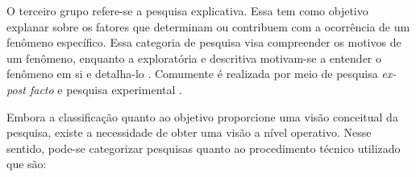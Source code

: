  \par
  \indent O terceiro grupo refere-se a pesquisa explicativa. Essa tem como objetivo explanar sobre os fatores que determinam ou contribuem com  a ocorrência de um fenômeno específico. Essa categoria de pesquisa visa compreender os motivos de um fenômeno, enquanto a exploratória e descritiva motivam-se a entender o fenômeno em si e detalha-lo \cite{gil_2002}. Comumente é realizada por meio de pesquisa \textit{ ex-post facto} e pesquisa experimental \cite{tafner_2007}. 

 \par
 \indent Embora a classificação quanto ao objetivo proporcione uma visão conceitual da pesquisa, existe a necessidade de obter uma visão a nível operativo. Nesse sentido, pode-se categorizar pesquisas quanto ao procedimento técnico utilizado que são:
 
